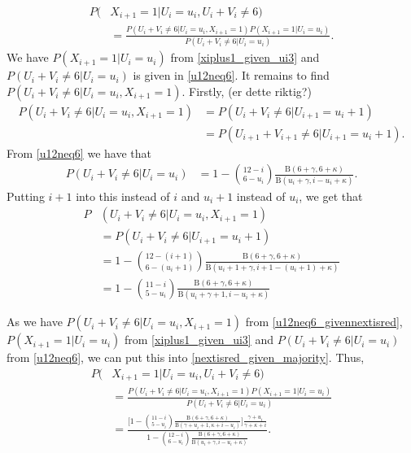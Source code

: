 \begin{equation}
\label{nextisred_given_majority}
    \begin{aligned}
        P(&X_{i+1}=1|U_i=u_i,U_i+V_i\neq6) \\[6pt]
        &= \frac{P(U_i+V_i\neq6|U_i=u_i,X_{i+1}=1)P(X_{i+1}=1|U_i=u_i)}
        {P(U_i+V_i\neq6|U_i=u_i)}.
    \end{aligned}
\end{equation}
We have $P(X_{i+1}=1|U_i=u_i)$ from \eqref{xiplus1_given_ui3} and $P(U_i+V_i\neq6|U_i=u_i)$ is given in \eqref{u12neq6}. It remains to find $P(U_i+V_i\neq6|U_i=u_i,X_{i+1}=1)$.
Firstly, (er dette riktig?)
\begin{equation*}
    \begin{aligned}
        P(U_i+V_i\neq6|U_i=u_i,X_{i+1}=1) 
        &= P(U_i+V_i\neq6|U_{i+1}=u_i+1)\\[6pt]
        &= P(U_{i+1}+V_{i+1}\neq6|U_{i+1}=u_i+1).
    \end{aligned}
\end{equation*}
From \eqref{u12neq6} we have that
\begin{equation}
    \begin{aligned}
        P(U_i+V_i\neq6|U_i=u_i) 
        &= 1-\binom{12-i}{6-u_i} \frac{\text{B}(6+\gamma,6+\kappa)}{\text{B}(u_i+\gamma,i-u_i+\kappa)}.
    \end{aligned}
\end{equation}
Putting $i+1$ into this instead of $i$ and $u_i+1$ instead of $u_i$, we get that
\begin{equation}
\label{u12neq6_givennextisred}
    \begin{aligned}
        P&(U_i+V_i\neq6|U_i=u_i,X_{i+1}=1)\\[6pt] 
        &= P(U_i+V_i\neq6|U_{i+1}=u_i+1)\\[6pt]
        &= 1-\binom{12-(i+1)}{6-(u_i+1)} \frac{\text{B}(6+\gamma,6+\kappa)}{\text{B}(u_i+1+\gamma,i+1-(u_i+1)+\kappa)}\\[6pt]
        &= 1-\binom{11-i}{5-u_i} \frac{\text{B}(6+\gamma,6+\kappa)}{\text{B}(u_i+\gamma+1,i-u_i+\kappa)}
    \end{aligned}
\end{equation}


As we have $P(U_i+V_i\neq6|U_i=u_i,X_{i+1}=1)$ from \eqref{u12neq6_givennextisred}, $P(X_{i+1}=1|U_i=u_i)$ from \eqref{xiplus1_given_ui3} and $P(U_i+V_i\neq6|U_i=u_i)$ from \eqref{u12neq6}, we can put this into \eqref{nextisred_given_majority}. Thus,
\begin{equation}
    \begin{aligned}
        P(&X_{i+1}=1|U_i=u_i,U_i+V_i\neq6) \\[6pt]
        &= \frac{P(U_i+V_i\neq6|U_i=u_i,X_{i+1}=1)P(X_{i+1}=1|U_i=u_i)}
        {P(U_i+V_i\neq6|U_i=u_i)}\\[6pt]
        &= \frac{\bigg[ 1 - \binom{11-i}{5-u_i}\frac{\text{B}(6+\gamma,6+\kappa)}{\text{B}(\gamma+u_i+1,\kappa+i-u_i)} \bigg]
        \frac{\gamma+u_i}
        {\gamma+\kappa+i}}
        {1-\binom{12-i}{6-u_i} \frac{\text{B}(6+\gamma,6+\kappa)}{\text{B}(u_i+\gamma,i-u_i+\kappa)}}.
    \end{aligned}
\end{equation}
